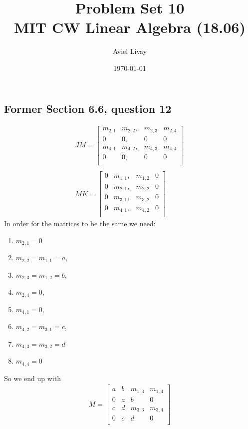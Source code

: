 \documentclass[a4paper,11pt]{article}
\title{%
	Problem Set 10\\
	\large MIT CW Linear Algebra (18.06)
}
\author{Aviel Livay}
\date{\today}
\newcommand{\?}{\stackrel{?}{=}}
\begin{document}
\maketitle

\subsection*{Former Section 6.6, question 12}
\begin{align*}
JM = 
\begin{bmatrix}
m_{2,1} & m_{2,2}, & m_{2,3} & m_{2,4} \\
0 & 0, & 0 & 0 \\
m_{4,1} & m_{4,2}, & m_{4,3} & m_{4,4} \\
0 & 0, & 0 & 0 \\
\end{bmatrix}\\\\
MK = 
\begin{bmatrix}
0 & m_{1,1}, & m_{1,2} & 0 \\
0 & m_{2,1}, & m_{2,2} & 0 \\
0 & m_{3,1}, & m_{3,2} & 0 \\
0 & m_{4,1}, & m_{4,2} & 0 \\
\end{bmatrix}
\end{align*}
In order for the matrices to be the same we need:
\begin{enumerate}
\item $m_{2,1}=0$
\item $m_{2,2}=m_{1,1}=a$, 
\item $m_{2,3}=m_{1,2}=b$, 
\item $m_{2,4}=0$, 
\item $m_{4,1}=0$, 
\item $m_{4,2}=m_{3,1}=c$,
\item $m_{4,3}=m_{3,2}=d$
\item $m_{4,4}=0$ 
\end{enumerate}
So we end up with
\begin{align*}
M = 
\begin{bmatrix}
a & b & m_{1,3} & m_{1,4} \\
0 & a & b & 0 \\
c & d & m_{3,3} & m_{3,4} \\
0 & c & d & 0 \\
\end{bmatrix}
\end{align*}
\end{document}
